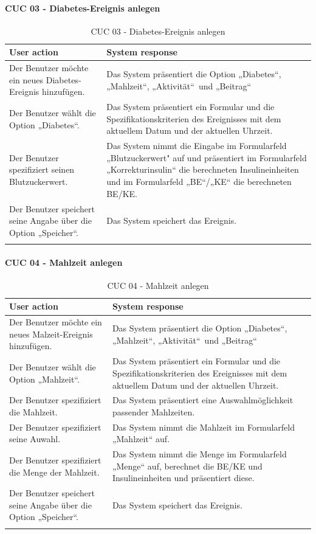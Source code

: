 \paragraph{CUC 03 - Diabetes-Ereignis anlegen}
\begin{center}
	\begin{longtable}[H]{|p{6cm}|p{6cm}|}
		\hline
		\textbf{User action} & \textbf{System response}\\
		\hline
		Der Benutzer möchte ein neues Diabetes-Ereignis hinzufügen. & Das System präsentiert die Option „Diabetes“, „Mahlzeit“, „Aktivität“\ und „Beitrag“\\
		\hline
		Der Benutzer wählt die Option „Diabetes“. &  Das System präsentiert ein Formular und die Spezifikationskriterien des Ereignisses mit dem aktuellem Datum und der aktuellen Uhrzeit.\\
		\hline
		Der Benutzer spezifiziert seinen Blutzuckerwert. & Das System nimmt die Eingabe im Formularfeld „Blutzuckerwert" auf und präsentiert im Formularfeld „Korrekturinsulin“ die berechneten Insulineinheiten und im Formularfeld „BE“/„KE“ die berechneten BE/KE.\\
		\hline
		Der Benutzer speichert seine Angabe über die Option „Speicher“. & Das System speichert das Ereignis.\\
		\hline
		\captionsetup{justification=centering}
		\caption{CUC 03 - Diabetes-Ereignis anlegen}
		\label{tab:Persona Use Cases 3}
	\end{longtable}
\end{center}
\paragraph{CUC 04 - Mahlzeit anlegen}
\begin{center}
	\begin{longtable}[H]{|p{6cm}|p{6cm}|}
		\hline
		\textbf{User action} & \textbf{System response}\\
		\hline
		Der Benutzer möchte ein neues Malzeit-Ereignis hinzufügen. & Das System präsentiert die Option „Diabetes“, „Mahlzeit“, „Aktivität“\ und „Beitrag“\\
		\hline
		Der Benutzer wählt die Option „Mahlzeit“. &  Das System präsentiert ein Formular und die Spezifikationskriterien des Ereignisses mit dem aktuellem Datum und der aktuellen Uhrzeit.\\
		\hline
		Der Benutzer spezifiziert die Mahlzeit. & Das System präsentiert eine Auswahlmöglichkeit passender Mahlzeiten.\\
		\hline
		Der Benutzer spezifiziert seine Auwahl. & Das System nimmt die Mahlzeit im Formularfeld „Mahlzeit“ auf.\\
		\hline
		Der Benutzer spezifiziert die Menge der Mahlzeit. & Das System nimmt die Menge im Formularfeld „Menge“ auf, berechnet die BE/KE und Insulineinheiten und präsentiert diese.\\
		\hline
		Der Benutzer speichert seine Angabe über die Option „Speicher“. & Das System speichert das Ereignis.\\
		\hline
		\captionsetup{justification=centering}
		\caption{CUC 04 - Mahlzeit anlegen}
		\label{tab:Persona Use Cases 4}
	\end{longtable}
\end{center}

